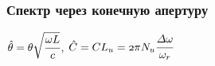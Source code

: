 \documentclass[14pt, hyperref = {colorlinks},xcolor=table ]{beamer}
\begin{document}
\small
\begin{frame}
\frametitle{Спектр через конечную апертуру}\label{t1}
\begin{figure}[h]
	\begin{minipage}[h]{0.99\linewidth}
	\end{minipage}	
\end{figure}
\hspace{-0pt}\tiny{$\hat{\theta} = \theta\sqrt{\cfrac{\omega L}{c}}$}, \tiny{$\mathnormal{\hat{C} = CL_u = 2\pi N_u\cfrac{\Delta\omega}{\omega_r}}$}
\end{frame}
\end{document}
